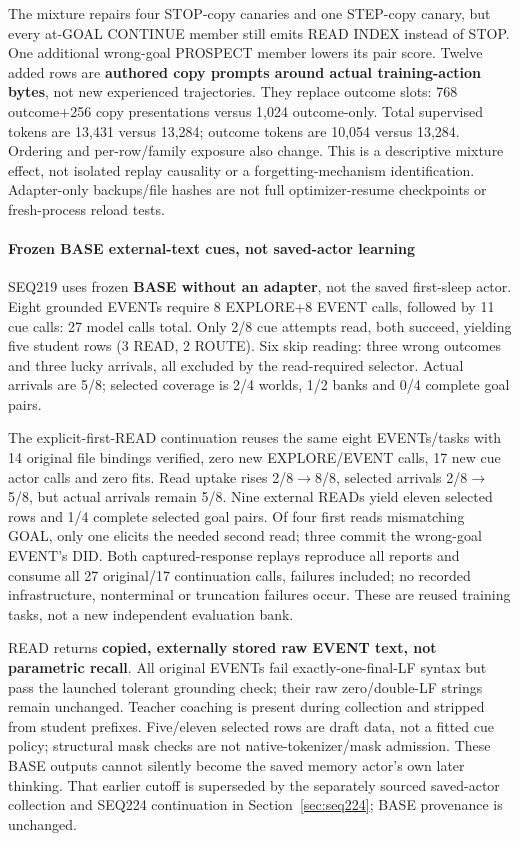 \documentclass[11pt]{article}
\begin{document}
The mixture repairs four STOP-copy canaries and one STEP-copy canary, but every
at-GOAL CONTINUE member still emits READ INDEX instead of STOP. One additional
wrong-goal PROSPECT member lowers its pair score. Twelve added rows are
\textbf{authored copy prompts around actual training-action bytes}, not new experienced
trajectories. They replace outcome slots: 768 outcome+256 copy presentations
versus 1,024 outcome-only. Total supervised tokens are 13,431 versus 13,284;
outcome tokens are 10,054 versus 13,284. Ordering and per-row/family exposure
also change. This is a descriptive mixture effect, not isolated replay causality
or a forgetting-mechanism identification. Adapter-only backups/file hashes
are not full optimizer-resume checkpoints or fresh-process reload tests.

\paragraph{Frozen BASE external-text cues, not saved-actor learning}

SEQ219 uses frozen \textbf{BASE without an adapter}, not the saved first-sleep actor.
Eight grounded EVENTs require 8 EXPLORE+8 EVENT calls, followed by 11 cue calls:
27 model calls total. Only 2/8 cue attempts read, both succeed, yielding five
student rows (3 READ, 2 ROUTE). Six skip reading: three wrong outcomes and three
lucky arrivals, all excluded by the read-required selector. Actual arrivals are
5/8; selected coverage is 2/4 worlds, 1/2 banks and 0/4 complete goal pairs.

The explicit-first-READ continuation reuses the same eight EVENTs/tasks with
14 original file bindings verified, zero new EXPLORE/EVENT calls, 17 new cue
actor calls and zero fits. Read uptake rises 2/8$\to$8/8, selected arrivals 2/8$\to$5/8,
but actual arrivals remain 5/8. Nine external READs yield eleven selected rows
and 1/4 complete selected goal pairs. Of four first reads mismatching GOAL,
only one elicits the needed second read; three commit the wrong-goal EVENT's
DID. Both captured-response replays reproduce all reports and consume all
27 original/17 continuation calls, failures included; no recorded infrastructure,
nonterminal or truncation failures occur. These are reused training tasks,
not a new independent evaluation bank.

READ returns \textbf{copied, externally stored raw EVENT text, not parametric recall}.
All original EVENTs fail exactly-one-final-LF syntax but pass the launched
tolerant grounding check; their raw zero/double-LF strings remain unchanged.
Teacher coaching is present during collection and stripped from student prefixes.
Five/eleven selected rows are draft data, not a fitted cue policy; structural
mask checks are not native-tokenizer/mask admission. These BASE outputs cannot
silently become the saved memory actor's own later thinking. That earlier
cutoff is superseded by the separately sourced saved-actor collection and
SEQ224 continuation in Section~\ref{sec:seq224}; BASE provenance is unchanged.
\end{document}
